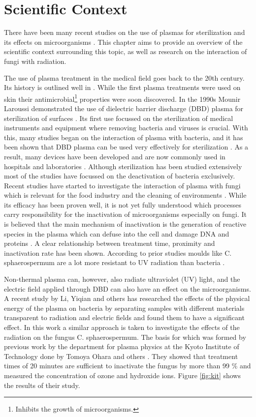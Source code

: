 \chapter{Scientific Context}
\label{chap:scientific_context}
There have been many recent studies on the use of plasmas for sterilization and its effects on microorganisms \cite{bacteria, app_study, kit, wound,inactivation}. This chapter aims to provide an overview of the scientific context surrounding this topic, as well as research on the interaction of fungi with radiation.

The use of plasma treatment in the medical field goes back to the 20th century. Its history is outlined well in \cite{history}. While the first plasma treatments were used on skin their antimicrobial\footnote{Inhibits the growth of microorganisms.} properties were soon discovered. In the 1990s Mounir Laroussi demonstrated the use of dielectric barrier discharge (DBD) plasma for sterilization of surfaces \cite{laroussi}. Its first use focussed on the sterilization of medical instruments and equipment where removing bacteria and viruses is crucial. With this, many studies began on the interaction of plasma with bacteria, and it has been shown that DBD plasma can be used very effectively for sterilization \cite{inactivation, app_study}. As a result, many devices have been developed and are now commonly used in hospitals and laboratories \cite{history}. Although sterilization has been studied extensively most of the studies have focussed on the deactivation of bacteria exclusively. Recent studies have started to investigate the interaction of plasma with fungi which is relevant for the food industry and the cleaning of environments  \cite{growth}. While its efficacy has been proven well, it is not yet fully understood which processes carry responsibility for the inactivation of microorganisms especially on fungi. It is believed that the main mechanism of inactivation is the generation of reactive species in the plasma which can defuse into the cell and damage DNA and proteins \cite{app_study, inactivation}. A clear relationship between treatment time, proximity and inactivation rate has been shown. According to prior studies moulds like C. sphaerospermum are a lot more resistant to UV radiation than bacteria \cite{app_study}. 

Non-thermal plasma can, however, also radiate ultraviolet (UV) light, and the electric field applied through DBD can also have an effect on the microorganisms. A recent study by Li, Yiqian and others \cite{bacteria} has researched the effects of the physical energy of the plasma on bacteria by separating samples with different materials transparent to radiation and electric fields and found them to have a significant effect. In this work a similar approach is taken to investigate the effects of the radiation on the fungus C. sphaerospermum. The basis for which was formed by previous work by the department for plasma physics at the Kyoto Institute of Technology done by Tomoya Ohara and others \cite{kit}. They showed that treatment times of 20 minutes are sufficient to inactivate the fungus by more than 99 \% and measured the concentration of ozone and hydroxide ions. Figure \ref{fig:kit} shows the results of their study.

